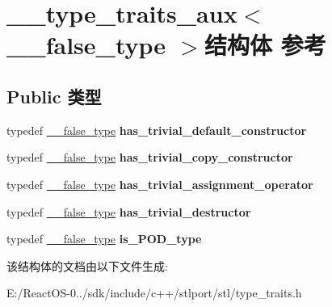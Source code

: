 \hypertarget{struct____type__traits__aux_3_01____false__type_01_4}{}\section{\+\_\+\+\_\+type\+\_\+traits\+\_\+aux$<$ \+\_\+\+\_\+false\+\_\+type $>$结构体 参考}
\label{struct____type__traits__aux_3_01____false__type_01_4}
\subsection*{Public 类型}
\begin{DoxyCompactItemize}
\item 
\mbox{\label{struct____type__traits__aux_3_01____false__type_01_4_a72df287d1e3fffa19c33fa50bf82daba}} 
typedef \hyperlink{struct____false__type}{\+\_\+\+\_\+false\+\_\+type} {\bfseries has\+\_\+trivial\+\_\+default\+\_\+constructor}
\item 
\mbox{\label{struct____type__traits__aux_3_01____false__type_01_4_a229af279fca02c33bb7e9db6f9fc9af3}} 
typedef \hyperlink{struct____false__type}{\+\_\+\+\_\+false\+\_\+type} {\bfseries has\+\_\+trivial\+\_\+copy\+\_\+constructor}
\item 
\mbox{\label{struct____type__traits__aux_3_01____false__type_01_4_aea786551eb90442cbf0c73fc47b23dc6}} 
typedef \hyperlink{struct____false__type}{\+\_\+\+\_\+false\+\_\+type} {\bfseries has\+\_\+trivial\+\_\+assignment\+\_\+operator}
\item 
\mbox{\label{struct____type__traits__aux_3_01____false__type_01_4_a1f4d825ac88e8d87eb7acf5565ef57a6}} 
typedef \hyperlink{struct____false__type}{\+\_\+\+\_\+false\+\_\+type} {\bfseries has\+\_\+trivial\+\_\+destructor}
\item 
\mbox{\label{struct____type__traits__aux_3_01____false__type_01_4_a1dd1e0aceae3f607b6a4d00229d0cc5c}} 
typedef \hyperlink{struct____false__type}{\+\_\+\+\_\+false\+\_\+type} {\bfseries is\+\_\+\+P\+O\+D\+\_\+type}
\end{DoxyCompactItemize}


该结构体的文档由以下文件生成\+:\begin{DoxyCompactItemize}
\item 
E\+:/\+React\+O\+S-\/0../sdk/include/c++/stlport/stl/type\+\_\+traits.\+h\end{DoxyCompactItemize}
